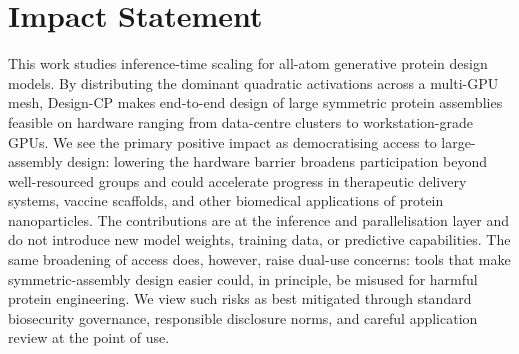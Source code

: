 \documentclass{article}
\theoremstyle{plain}
\theoremstyle{definition}
\theoremstyle{remark}
\begin{document}
\section*{Impact Statement}




This work studies inference-time scaling for all-atom generative protein design models. By distributing the dominant quadratic activations across a multi-GPU mesh, Design-CP makes end-to-end design of large symmetric protein assemblies feasible on hardware ranging from data-centre clusters to workstation-grade GPUs. We see the primary positive impact as democratising access to large-assembly design: lowering the hardware barrier broadens participation beyond well-resourced groups and could accelerate progress in therapeutic delivery systems, vaccine scaffolds, and other biomedical applications of protein nanoparticles. The contributions are at the inference and parallelisation layer and do not introduce new model weights, training data, or predictive capabilities. The same broadening of access does, however, raise dual-use concerns: tools that make symmetric-assembly design easier could, in principle, be misused for harmful protein engineering. We view such risks as best mitigated through standard biosecurity governance, responsible disclosure norms, and careful application review at the point of use.
\end{document}
